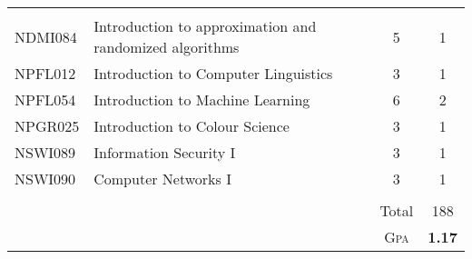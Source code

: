 \documentclass[a4paper,10pt]{article}
\begin{document}
\begin{center}
\begin{supertabular}{l l c c}
\hline\\

NDMI084 & Introduction to approximation and randomized algorithms & 5 & 1\\
NPFL012 & Introduction to Computer Linguistics & 3 & 1\\
NPFL054 & Introduction to Machine Learning & 6 & 2\\
NPGR025 & Introduction to Colour Science & 3 & 1\\
NSWI089 & Information Security I & 3 & 1\\
NSWI090 & Computer Networks I & 3 & 1\\

 
\\
& & Total & 188\\
& &\textsc{Gpa} & \textbf{1.17}\\
\end{supertabular}
\end{center}
\end{document}
